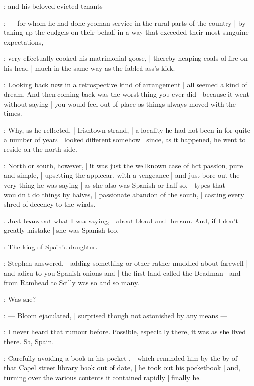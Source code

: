 :
and his beloved evicted tenants

:
    --- for whom he had done yeoman service in the rural parts of the country |
        by taking up the cudgels on their behalf
        in a way that exceeded their most sanguine expectations, ---

:
very effectually cooked his matrimonial goose, |
thereby heaping coals of fire on his head |
much in the same way as the fabled ass's kick.

:
Looking back now in a retrospective kind of arrangement |
all seemed a kind of dream.
And then coming back was the worst thing you ever did |
because it went without saying |
you would feel out of place as things always moved with the times.

:
Why, as he reflected, |
Irishtown strand, |
a locality he had not been in for quite a number of years |
looked different somehow |
since, as it happened, he went to reside on the north side.

:
North or south, however, |
it was just the wellknown case of hot passion, pure and simple, |
upsetting the applecart with a vengeance |
and just bore out the very thing he was saying |
as she also was Spanish or half so, |
types that wouldn't do things by halves, |
passionate abandon of the south, |
casting every shred of decency to the winds.

\Bloom:
Just bears out what I was saying, |
about blood and the sun.
And, if I don't greatly mistake |
she was Spanish too.

\Stephen:
The king of Spain's daughter.

:
Stephen answered, |
adding something or other rather muddled about farewell |
and adieu to you Spanish onions and |
the first land called the Deadman |
and from Ramhead to Scilly was so and so many.

\Bloom:
Was she?

:
    --- Bloom ejaculated, |
        surprised though not astonished by any means ---

\Bloom:
I never heard that rumour before.
Possible, especially there, it was as she lived there.
So, Spain.

:
Carefully avoiding a book in his pocket , |
which reminded him by the by of that Capel street library book out of date, |
he took out his pocketbook |
and, turning over the various contents it contained rapidly |
finally he.

